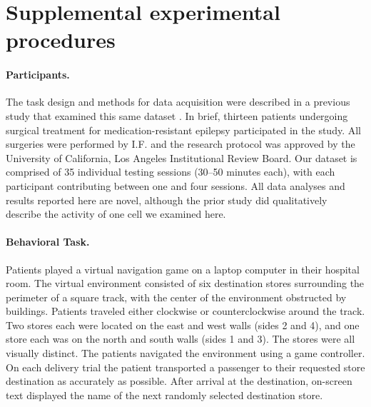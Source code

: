 \section{Supplemental experimental procedures}

\paragraph{Participants.} The task design and methods for data acquisition were described in a previous study that examined this same dataset \citep{JacoEtal10}. In brief, thirteen patients undergoing surgical treatment for medication-resistant epilepsy participated in the study.  All surgeries were performed by I.F. and the research protocol was approved by the University of California, Los Angeles Institutional Review Board.  Our dataset is comprised of 35 individual testing sessions (30--50 minutes each), with each participant contributing between one and four sessions.  All data analyses and results reported here are novel, although the prior study \citep{JacoEtal10} did qualitatively describe the activity of one cell we examined here.

\paragraph{Behavioral Task.} Patients played a virtual navigation game  \citep{EkstEtal03,JacoEtal10,JacoEtal13} on a laptop computer in their hospital room. The virtual environment consisted of six destination stores surrounding the perimeter of a square track, with the center of the environment obstructed by buildings. Patients traveled either clockwise or counterclockwise around the track. Two stores each were located on the east and west walls (sides 2 and 4), and one store each was on the north and south walls (sides 1 and 3). The stores were all visually distinct. The patients navigated the environment using a game controller. On each delivery trial the patient transported a passenger to their requested store destination as accurately as possible.  After arrival at the destination, on-screen text displayed the name of the next randomly selected destination store.

